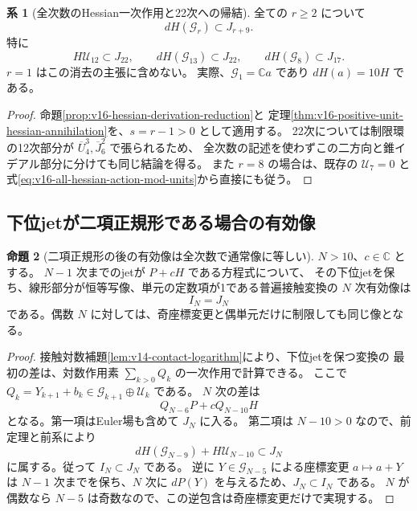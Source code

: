 \documentclass[a4paper,11pt]{ltjsarticle}
\theoremstyle{definition}
\newtheorem{theorem}{命題}[section]
\newtheorem{corollary}[theorem]{系}
\begin{document}
\begin{corollary}[全次数のHessian一次作用と22次への帰結]
\label{cor:v16-all-hessian-first-actions}
全ての $r\ge2$ について
\begin{equation}\label{eq:v16-all-hessian-first-actions}
 dH(\mathcal G_r)\subset J_{r+9}.
\end{equation}
特に
\[
 H\mathcal U_{12}\subset J_{22},\qquad
 dH(\mathcal G_{13})\subset J_{22},\qquad
 dH(\mathcal G_8)\subset J_{17}.
\]
$r=1$ はこの消去の主張に含めない。
実際、$\mathcal G_1=\mathbb C a$ であり $dH(a)=10H$ である。
\end{corollary}

\begin{proof}
命題\ref{prop:v16-hessian-derivation-reduction}と
定理\ref{thm:v16-positive-unit-hessian-annihilation}を、$s=r-1>0$ として適用する。
22次については制限環の12次部分が $\overline U_4^3,\overline J_6^2$ で張られるため、
全次数の記述を使わずこの二方向と錐イデアル部分に分けても同じ結論を得る。
また $r=8$ の場合は、既存の $\mathcal U_7=0$ と
式\eqref{eq:v16-all-hessian-action-mod-units}から直接にも従う。
\end{proof}

\subsection{下位jetが二項正規形である場合の有効像}

\begin{theorem}[二項正規形の後の有効像は全次数で通常像に等しい]
\label{thm:v16-all-effective-images}
$N>10$、$c\in\mathbb C$ とする。
$N-1$ 次までのjetが $P+cH$ である方程式について、
その下位jetを保ち、線形部分が恒等写像、単元の定数項が1である普遍接触変換の
$N$ 次有効像は
\begin{equation}\label{eq:v16-all-effective-images}
 I_N=J_N
\end{equation}
である。偶数 $N$ に対しては、奇座標変更と偶単元だけに制限しても同じ像となる。
\end{theorem}

\begin{proof}
接触対数補題\ref{lem:v14-contact-logarithm}により、下位jetを保つ変換の
最初の差は、対数作用素 $\sum_{k>0}Q_k$ の一次作用で計算できる。
ここで $Q_k=Y_{k+1}+b_k\in\mathcal G_{k+1}\oplus\mathcal U_k$ である。
$N$ 次の差は
\[
 Q_{N-6}P+cQ_{N-10}H
\]
となる。第一項はEuler場も含めて $J_N$ に入る。
第二項は $N-10>0$ なので、前定理と前系により
\[
 dH(\mathcal G_{N-9})+H\mathcal U_{N-10}\subset J_N
\]
に属する。従って $I_N\subset J_N$ である。
逆に $Y\in\mathcal G_{N-5}$ による座標変更 $a\mapsto a+Y$ は
$N-1$ 次までを保ち、$N$ 次に $dP(Y)$ を与えるため、$J_N\subset I_N$ である。
$N$ が偶数なら $N-5$ は奇数なので、この逆包含は奇座標変更だけで実現する。
\end{proof}
\end{document}
